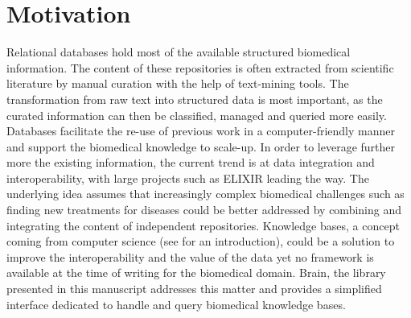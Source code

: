 \documentclass{bioinfo}
\begin{document}
\section{Motivation}
Relational databases hold most of the available structured biomedical information. The content of these repositories is often
extracted from scientific literature by manual curation with the help of text-mining tools. The transformation from raw text into
structured data is most important, as the curated information can then be classified, managed and queried more easily. Databases facilitate
the re-use of previous work in a computer-friendly manner and support the biomedical knowledge to scale-up. In order to leverage further 
more the existing information, the current trend is at data integration and interoperability, with large projects such as 
ELIXIR \citep{Crosswell2012} leading the way.
The underlying idea assumes that increasingly complex biomedical challenges such as finding new treatments for diseases could be better 
addressed by combining  and integrating the content of independent repositories. 
Knowledge bases, a concept coming from computer science (see \citealp{Krotzsch2012} for an introduction), 
could be a solution to improve the interoperability and the value of the data yet no framework is available at the time of writing for 
the biomedical domain. Brain, the library presented in this manuscript addresses this matter and provides a simplified 
interface dedicated to handle and query biomedical knowledge bases.
\end{document}

